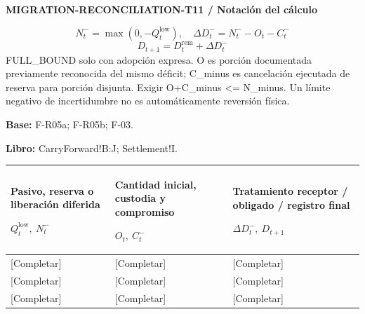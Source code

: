 \textbf{MIGRATION-RECONCILIATION-T11 / Notación del cálculo}\par
{\fontsize{9}{11}\selectfont\[ N_t^-=\max(0,-Q_t^{\mathrm{low}}),\quad \Delta D_t^-=N_t^- -O_t-C_t^- \]}
{\fontsize{9}{11}\selectfont\[ D_{t+1}=D_t^{\mathrm{rem}}+\Delta D_t^- \]}
FULL\_BOUND solo con adopción expresa. O es porción documentada previamente reconocida del mismo déficit; C\_minus es cancelación ejecutada de reserva para porción disjunta. Exigir O+C\_minus <= N\_minus. Un límite negativo de incertidumbre no es automáticamente reversión física.\par
\textbf{Base:} F-R05a; F-R05b; F-03.\par
\textbf{Libro:} CarryForward!B:J; Settlement!I.\par\endgroup
{\sffamily\fontsize{8.3}{10.3}\selectfont\begin{longtable}{@{}P{54.83mm} P{54.83mm} P{54.83mm}@{}}
\toprule
\textbf{Pasivo, reserva o liberación diferida}\par {\normalfont\fontsize{8.2}{10}\selectfont $Q_t^{\mathrm{low}},\ N_t^-$} & \textbf{Cantidad inicial, custodia y compromiso}\par {\normalfont\fontsize{8.2}{10}\selectfont $O_t,\ C_t^-$} & \textbf{Tratamiento receptor / obligado / registro final}\par {\normalfont\fontsize{8.2}{10}\selectfont $\Delta D_t^-,\ D_{t+1}$}\\\midrule\endhead
\rule{0pt}{8mm}[Completar] & [Completar] & [Completar]\\\hline
\rule{0pt}{8mm}[Completar] & [Completar] & [Completar]\\\hline
\rule{0pt}{8mm}[Completar] & [Completar] & [Completar]\\\hline
\end{longtable}}
\par\begingroup\sffamily\fontsize{8}{10}\selectfont\color{NEBGreen}\setlength{\parskip}{2pt}\setlength{\abovedisplayskip}{4pt}\setlength{\belowdisplayskip}{4pt}\setlength{\abovedisplayshortskip}{2pt}\setlength{\belowdisplayshortskip}{3pt}
